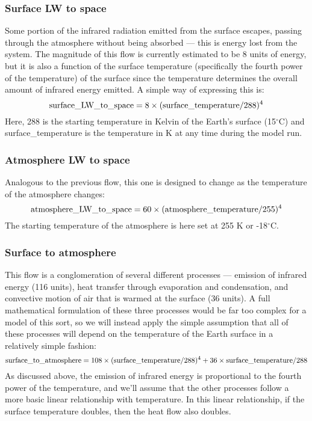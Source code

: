 \documentclass[11pt,letterpaper]{article}
\begin{document}
\subsubsection*{Surface LW to space}
Some portion of the infrared radiation emitted from the surface escapes, passing through the atmosphere without being absorbed --- this
is energy lost from the system. The magnitude of this flow is currently estimated to be 8 units of energy, but it is also a function of the surface temperature (specifically the fourth power of the temperature) of the surface since the temperature determines the overall amount of
infrared energy emitted. A simple way of expressing this is:
$$\rm surface\_LW\_to\_space = 8\times(surface\_temperature{/}288)^4 $$
Here, 288 is the starting temperature in Kelvin of the Earth's surface (15$^\circ$C) and surface\_temperature is the temperature in K at any time during the model run.

\subsubsection*{Atmosphere LW to space}
Analogous to the previous flow, this one is designed to change as the temperature of the atmosphere changes:
$$\rm atmosphere\_LW\_to\_space = 60\times(atmosphere\_temperature/255)^4$$
The starting temperature of the atmosphere is here set at 255 K or -18$^\circ$C.

\subsubsection*{Surface to atmosphere}
This flow is a conglomeration of several different processes --- emission of infrared energy (116 units), heat transfer through
evaporation and condensation, and convective motion of air that is warmed at the surface (36 units). A full mathematical formulation of
these three processes would be far too complex for a model of this sort, so we will instead apply the simple assumption that all of these
processes will depend on the temperature of the Earth surface in a relatively simple fashion:
$$\rm surface\_to\_atmosphere = 108\times(surface\_temperature/288)^4 + 36\times surface\_temperature/288$$
As discussed above, the emission of infrared energy is proportional to the fourth power of the temperature, and we'll assume that the other
processes follow a more basic linear relationship with temperature. In this linear relationship, if the surface temperature doubles,
then the heat flow also doubles.
\end{document}
